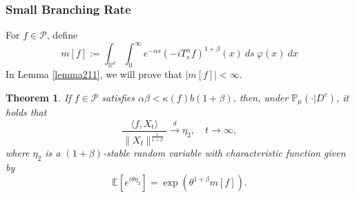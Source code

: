 \documentclass[12pt,oneside,english]{amsart}
\theoremstyle{plain}
\newtheorem{thm}{Theorem}[section]
\theoremstyle{definition}
\numberwithin{equation}{section}
\begin{document}
\subsubsection{Small Branching Rate}

For $f\in \mathcal{P}$, define
$$m[f]:=\int_{\mathbb{R}^d}\int_0^{\infty} e^{-\alpha s}(-iT_{s}^{\alpha}f)^{1+\beta}(x)~ds~\varphi(x)~dx$$
In Lemma \ref{lemma211}, we will prove that $|m[f]|<\infty$.
\begin{thm}\label{Theorem13}
    If $f\in\mathcal{P}$ satisfies  $\alpha\beta<\kappa(f)b(1+\beta)$, then, under $\mathbb{P}_{\mu}(\cdot|D^c)$, it holds that
    $$\frac{\langle f,X_t\rangle}{\|X_t\|^{\frac{1}{1+\beta}}}\xrightarrow{d} \eta_2, \quad t\rightarrow \infty,$$
    where $\eta_2$ is a $(1+\beta)$-stable random variable with characteristic function given by
    $$\mathbb{E} [e^{i\theta \eta_2}]=\exp(\theta^{1+\beta}m[f]).$$
\end{thm}
\end{document}
